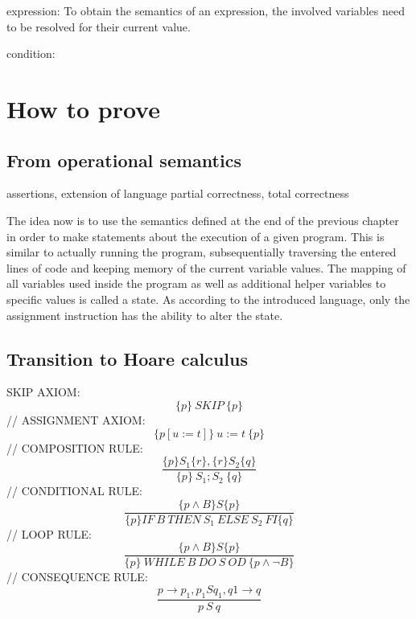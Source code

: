 expression:
To obtain the semantics of an expression, the involved variables need to be resolved for their current value.

condition:


\chapter{How to prove}

\section{From operational semantics}
assertions, extension of language
partial correctness, total correctness

The idea now is to use the semantics defined at the end of the previous chapter in order to make statements about the execution of a given program. This is similar to actually running the program, subsequentially traversing the entered lines of code and keeping memory of the current variable values. The mapping of all variables used inside the program as well as additional helper variables to specific values is called a state. As according to the introduced language, only the assignment instruction has the ability to alter the state.


\section{Transition to Hoare calculus}
SKIP AXIOM:
	\begin{equation}
		\{p\}\ SKIP\ \{p\}
	\end{equation}
//
ASSIGNMENT AXIOM:
	\begin{equation}
		\{p[u:=t]\}\ u:=t\ \{p\}
	\end{equation}
//
COMPOSITION RULE:
	\begin{equation}
		\dfrac{\{p\}S_1\{r\},\{r\}S_2\{q\}}{\{p\}\ S_1;S_2\ \{q\}}
	\end{equation}
//
CONDITIONAL RULE:
	\begin{equation}
		\dfrac{\{p\wedge B\} S \{p\}}{\{p\} IF\ B\ THEN\ S_1\ ELSE\ S_2\ FI\{q\}}
	\end{equation}
//
LOOP RULE:
	\begin{equation}
		\dfrac{\{p \wedge B\}S\{p\}}{\{p\}\ WHILE\ B\ DO\ S\ OD\ \{p \wedge \neg B\}}
	\end{equation}
//
CONSEQUENCE RULE:
	\begin{equation}
		\dfrac{p \to p_1,{p_1}S{q_1},q1 \to q}{{p}\ S\ {q}}
	\end{equation}

